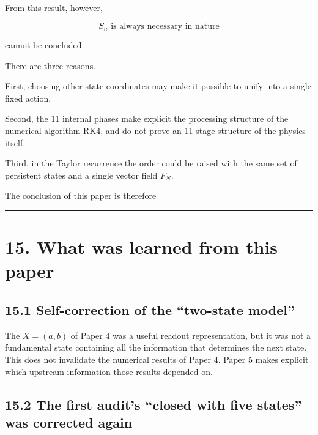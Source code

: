 \documentclass[
  a4paper,
]{article}
\begin{document}
From this result, however,

\[
\boxed{
S_n\text{ is always necessary in nature}
}
\]

cannot be concluded.

There are three reasons.

First, choosing other state coordinates may make it possible to unify
into a single fixed action.

Second, the 11 internal phases make explicit the processing structure of
the numerical algorithm RK4, and do not prove an 11-stage structure of
the physics itself.

Third, in the Taylor recurrence the order could be raised with the same
set of persistent states and a single vector field \(F_N\).

The conclusion of this paper is therefore

\begin{center}
\end{center}

\begin{center}\rule{0.5\linewidth}{0.5pt}\end{center}

\section{15. What was learned from this
paper}\label{what-was-learned-from-this-paper}

\subsection{15.1 Self-correction of the ``two-state
model''}\label{self-correction-of-the-two-state-model}

The \(X=(a,b)\) of Paper 4 was a useful readout representation, but it
was not a fundamental state containing all the information that
determines the next state. This does not invalidate the numerical
results of Paper 4. Paper 5 makes explicit which upstream information
those results depended on.

\subsection{15.2 The first audit's ``closed with five states'' was
corrected
again}\label{the-first-audits-closed-with-five-states-was-corrected-again}
\end{document}
